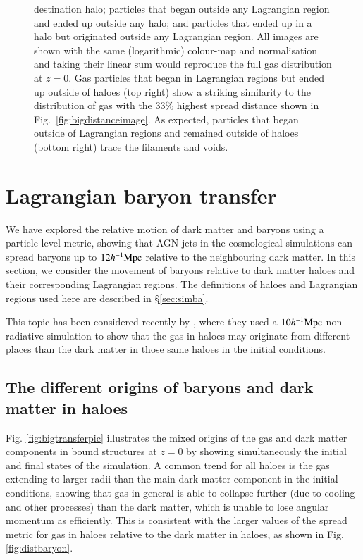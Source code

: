 \begin{figure}
{    destination halo; particles that began outside any Lagrangian region and
    ended up outside any halo; and particles that ended up in a halo but
    originated outside any Lagrangian region. All images are shown with the
    same (logarithmic) colour-map and normalisation and taking their linear
    sum would reproduce the full gas distribution at $z=0$. Gas particles
    that began in Lagrangian regions but ended up outside of haloes (top
    right) show a striking similarity to the distribution of gas with the
    33\% highest spread distance shown in Fig.~\ref{fig:bigdistanceimage}.
    As expected, particles that began outside of Lagrangian regions and
    remained outside of haloes (bottom right) trace the filaments and voids.}
    \vspace{1cm}
    \label{fig:lrtransfer}
\end{figure}

\section{Lagrangian baryon transfer}
\label{sec:transfer}

We have explored the relative motion of dark matter and baryons using a
particle-level metric, showing that AGN jets in the \simba{} cosmological
simulations can spread baryons up to $12h^{-1}{\rm Mpc}{}$ relative to the neighbouring
dark matter. In this section, we consider the movement of baryons relative to
dark matter haloes and their corresponding Lagrangian regions. The definitions of
haloes and Lagrangian regions used here are described in \S \ref{sec:simba}.

This topic has been considered recently by \citet{Liao2017}, where they used
a $10h^{-1}{\rm Mpc}{}$ non-radiative simulation to show that the gas in haloes may
originate from different places than the dark matter in those same haloes in
the initial conditions.

\subsection{The different origins of baryons and dark matter in haloes}

Fig. \ref{fig:bigtransferpic} illustrates the mixed origins of the gas and
dark matter components in bound structures at $z=0$ by showing simultaneously
the initial and final states of the simulation. A common trend for all haloes
is the gas extending to larger radii than the main dark matter component in
the initial conditions, showing that gas in general is able to collapse
further (due to cooling and other processes) than the dark matter, which is
unable to lose angular momentum as efficiently. This is consistent with the
larger values of the spread metric for gas in haloes relative to the dark
matter in haloes, as shown in Fig. \ref{fig:distbaryon}.

